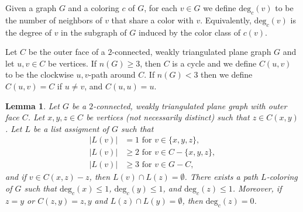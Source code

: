 \documentclass[12pt,letterpaper]{article}
\theoremstyle{plain}
\newtheorem{lemma}{Lemma}[section]           %
\theoremstyle{definition}
\theoremstyle{break}
\begin{document}
Given a graph $G$ and a coloring $c$ of $G$, for each $v\in G$ we
define $\text{deg}_c(v)$ to be the number of neighbors of $v$ that share a color
with $v$. Equivalently, $\text{deg}_c(v)$ is the degree of $v$ in the subgraph
of $G$ induced by the color class of $c(v)$.

Let $C$ be the outer face of a $2$-connected, weakly triangulated plane graph
$G$ and let $u,v\in C$ be vertices.
If $n(G)\ge3$, then $C$ is a cycle and we
define $C(u,v)$ to be the clockwise $u,v$-path
around $C$. If $n(G)<3$ then we define $C(u,v)=C$ if
$u\ne v$, and $C(u,u)=u$.

\begin{lemma}\label{L:hartman3}
Let $G$ be a $2$-connected, weakly triangulated plane graph with outer face
$C$. Let $x,y,z\in C$ be vertices (not necessarily distinct) such that
$z\in C(x,y)$. Let $L$ be a list assigment of $G$ such that
\begin{align*}
    |L(v)| &= 1 \text{ for } v\in\{x,y,z\},\\
    |L(v)| &\ge 2 \text{ for } v\in C-\{x,y,z\},\\
    |L(v)| &\ge 3 \text{ for } v\in G-C,
\end{align*}
and if $v\in C(x,z)-z$, then $L(v)\cap L(z)=\emptyset$.
There exists a path $L$-coloring of $G$ such that $\text{deg}_c(x)\le 1$,
$\text{deg}_c(y)\le 1$, and $\text{deg}_c(z)\le 1$. Moreover,
if $z=y$ or $C(z,y)=z,y$ and $L(z)\cap L(y)=\emptyset$,
then $\text{deg}_c(z)=0$.
\end{lemma}
\end{document}
